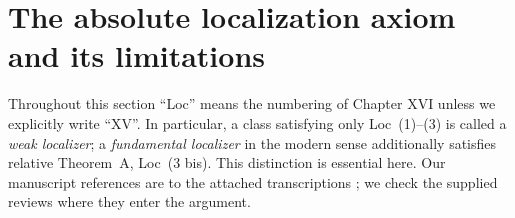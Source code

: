 \section{The absolute localization axiom and its limitations}
\label{sec:G}
\providecommand{\Wt}{\widetilde W}
\providecommand{\Wsharp}{W^{\sharp}}
\providecommand{\Hot}{\operatorname{Hot}}
\providecommand{\HOT}{\operatorname{HOT}}
\providecommand{\tors}{\operatorname{tors}}
\providecommand{\Gpd}{\operatorname{Gpd}}

Throughout this section ``Loc'' means the numbering of Chapter XVI unless
we explicitly write ``XV''.  In particular, a class satisfying only
Loc~(1)--(3) is called a \emph{weak localizer}; a \emph{fundamental
localizer} in the modern sense additionally satisfies relative Theorem~A,
Loc~(3 bis).  This distinction is essential here.
Our manuscript references are to the attached transcriptions
\cite{GDERXV,GDERXVI}; we check the supplied reviews
\cite{GR20,GREVLOC} where they enter the argument.

